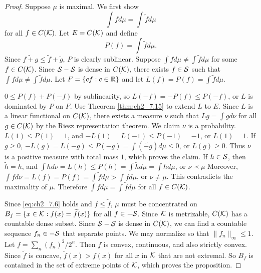 \begin{proof}
Suppose $\mu$ is maximal. We first show
\begin{equation}\label{eq:ch2_7.6}
    \int f d\mu = \int \widetilde{f}d\mu
\end{equation}
for all $f \in C(\mathcal{K})$. Let $E = C(\mathcal{K})$ and define
\begin{equation}\label{eq:ch2_7.7}
    P(f) = \int \widetilde{f}d\mu.
\end{equation}
Since $\widetilde{f + g} \leq \widetilde{f} + \widetilde{g}$, $P$ is clearly sublinear. Suppose $\int fd\mu \neq \int \widetilde{f}d\mu$ for some $f \in C(\mathcal{K})$. Since $\mathcal{S} - \mathcal{S}$ is dense in $C(\mathcal{K})$, there exists $f \in \mathcal{S}$ such that $\int fd\mu \neq \int \widetilde{f}d\mu$. Let $F = \{cf : c \in \mathbb{R}\}$ and let $L(f) = P(f) = \int \widetilde{f}d\mu$.

$0 \leq P(f) + P(-f)$ by sublinearity, so $L(-f) = -P(f) \leq P(-f)$, or $L$ is dominated by $P$ on $F$. Use Theorem \ref{thm:ch2_7.15} to extend $L$ to $E$. Since $L$ is a linear functional on $C(\mathcal{K})$, there exists a measure $\nu$ such that $Lg = \int gd\nu$ for all $g \in C(\mathcal{K})$ by the Riesz representation theorem. We claim $\nu$ is a probability. $L(1)\leq P(1)=1$, and $-L(1)=L(-1)\le P(-1)=-1$, or $L(1)=1$. If $g\ge 0$, $-L(g)=L(-g)\le P(-g)=\int (\widetilde{-g})d\mu\le 0$, or $L(g)\ge 0$. Thus $\nu$ is a positive measure with total mass $1$, which proves the claim. If $h \in \mathcal{S}$, then $\widetilde{h} = h$, and $\int hd\nu = L(h) \leq P(h) = \int \widetilde{h}d\mu = \int hd\mu$, or $\nu\prec \mu$ Moreover, $\int fd\nu = L(f) = P(f) = \int \widetilde{f}d\mu > \int fd\mu$, or $\nu \neq \mu$. This contradicts the maximality of $\mu$. Therefore $\int fd\mu = \int \widetilde{f}d\mu$ for all $f \in C(\mathcal{K})$.

Since \eqref{eq:ch2_7.6} holds and $f \leq \widetilde{f}$, $\mu$ must be concentrated on $B_f = \{x \in \mathcal{K} : f(x) = \widetilde{f}(x)\}$ for all $f \in -\mathcal{S}$. Since $\mathcal{K}$ is metrizable, $C(\mathcal{K})$ has a countable dense subset. Since $\mathcal{S}-\mathcal{S}$ is dense in $C(\mathcal{K})$, we can find a countable sequence $f_n \in -\mathcal{S}$ that separate points. We may normalize so that $\|f_n\|_\infty \leq 1$. Let $f = \sum_n(f_n)^2/2^n$. Then $f$ is convex, continuous, and also strictly convex. Since $\widetilde{f}$ is concave, $\widetilde{f}(x) > f(x)$ for all $x$ in $\mathcal{K}$ that are not extremal. So $B_f$ is contained in the set of extreme points of $\mathcal{K}$, which proves the proposition.
\end{proof}


